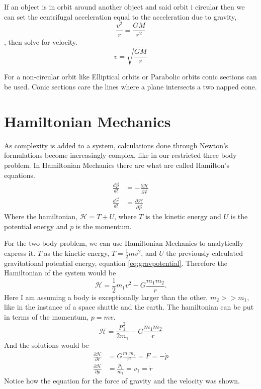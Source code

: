 \documentclass{article}
\begin{document}
If an object is in orbit around another object and said orbit i circular then we can set the centrifugal acceleration equal to the acceleration due to gravity, $$\frac{v^2}{r}=\frac{GM}{r^2}$$, then solve for velocity.
\begin{equation}
v=\sqrt{\frac{GM}{r}}
\end{equation}

For a non-circular orbit like Elliptical orbits or Parabolic orbits conic sections can be used. Conic sections care the lines where a plane intersects a two napped cone.

\section{Hamiltonian Mechanics}

As complexity is added to a system, calculations done through Newton's formulations become increasingly complex, like in our restricted three body problem. In Hamiltonian Mechanics there are what are called Hamilton's equations. 
\begin{align}
\frac{d\vec{p}}{dt}&=-\frac{\partial \mathcal{H}}{\partial \vec{r}}\\
\frac{d\vec{r}}{dt}&=\frac{\partial \mathcal{H}}{\partial \vec{p}}
\end{align}
Where the hamiltonian, $\mathcal{H}=T+U$, where $T$ is the kinetic energy and $U$ is the potential energy and $p$ is the momentum.

For the two body problem, we can use Hamiltonian Mechanics to analytically express it. $T$ as the kinetic energy, $T=\frac{1}{2}mv^2$, and $U$ the previously calculated gravitational potential energy, equation \ref{eq:gravpotential}. Therefore the Hamiltonian of the system would be $$\mathcal{H}=\frac{1}{2}m_1 v^2-G\frac{m_1 m_2}{r}.$$ Here I am assuming a body is exceptionally larger than the other, $m_2>>m_1$, like in the instance of a space shuttle and the earth. The hamiltonian can be put in terms of the momentum, $p=mv$. 
$$\mathcal{H}=\frac{p_1^2}{2m_1}-G\frac{m_1 m_2}{r}$$
And the solutions would be
\begin{align*}
\frac{\partial \mathcal{H}}{\partial r}&=G\frac{m_1 m_2}{r^2}=F=-\dot{p}\\
\frac{\partial \mathcal{H}}{\partial p}&=\frac{p_1}{m_1}=v_1=\dot{r}
\end{align*}
Notice how the equation for the force of gravity and the velocity was shown.
\end{document}
